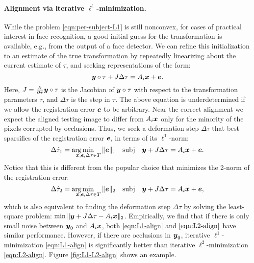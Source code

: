 \documentclass[10pt,twocolumn,letterpaper]{article}
\newcommand{\subj}{\mathrm{subj}}
\begin{document}
\paragraph{Alignment via iterative $\ell^1$-minimization.} While the problem \eqref{eqn:per-subject-L1} is still nonconvex, for cases of practical interest in face recognition, a good initial guess for the transformation is available, e.g., from the output of a face detector. We can refine this initialization to an estimate of the true transformation by repeatedly linearizing about  the current estimate of $\tau$, and seeking representations of the form:\vspace{-1mm}
\begin{equation}
\y\circ \tau + J \Delta \tau = A_i \x + \e.\vspace{-1mm}
\end{equation}
Here, $J = \frac{\partial}{\partial \tau} {\boldsymbol{y}} \circ \tau$ is the Jacobian of ${\boldsymbol{y}} \circ \tau$ with respect to the transformation parameters $\tau$, and $\Delta \tau$ is the step in $\tau$. The above equation is underdetermined if we allow the registration error $\boldsymbol{e}$ to be arbitrary. Near the correct alignment we expect the aligned testing image to differ from $A_i {\boldsymbol{x}}$ only for the minority of the pixels corrupted by occlusions. Thus, we seek a deformation step $\Delta \tau$ that best sparsifies of the registration error $\boldsymbol{e}$, in terms of its $\ell^1$-norm: \vspace{-1mm}
\begin{equation}
\Delta\hat{\tau}_1 = \arg\hspace{-3.5mm}\min_{\x,\e,\Delta\tau \in T} \| \e \|_1 \quad \subj \quad \y + J \Delta \tau = A_i \x + \e.\vspace{-1mm}
\label{eqn:L1-align}
\end{equation}
Notice that this is different from the popular choice that minimizes the 2-norm of the registration error:\vspace{-1mm}
\begin{equation}
\Delta\hat{\tau}_2 = \arg\hspace{-3.5mm}\min_{\x,\e,\Delta\tau \in T} \| \e \|_2 \quad \subj \quad \y + J \Delta \tau = A_i \x + \e,\vspace{-1mm}
\label{eqn:L2-align}
\end{equation}
which is also equivalent to finding the deformation step $\Delta  \tau$ by solving the least-square problem: $\min \|{\boldsymbol{y}} + J\Delta \tau - A_i {\boldsymbol{x}} \|_2$. Empirically, we find that if there is only small noise between ${\boldsymbol{y}}_0$ and $A_i{\boldsymbol{x}}$, both \eqref{eqn:L1-align} and $\eqref{eqn:L2-align}$ have similar performance.  However, if there are occlusions in ${\boldsymbol{y}}_0$, iterative $\ell^1$-minimization \eqref{eqn:L1-align} is significantly better than iterative $\ell^2$-minimization \eqref{eqn:L2-align}. Figure \ref{fig:L1-L2-align} shows an example.
\end{document}
